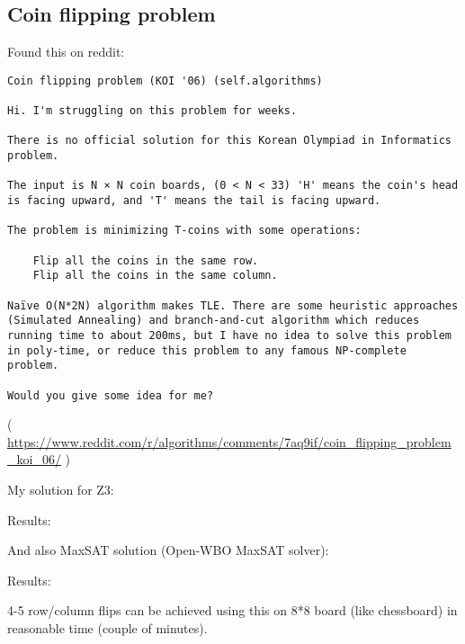 \subsection{Coin flipping problem}
\label{coin_flip}

Found this on reddit:

\begin{lstlisting}
Coin flipping problem (KOI '06) (self.algorithms)

Hi. I'm struggling on this problem for weeks.

There is no official solution for this Korean Olympiad in Informatics problem.

The input is N × N coin boards, (0 < N < 33) 'H' means the coin's head is facing upward, and 'T' means the tail is facing upward.

The problem is minimizing T-coins with some operations:

    Flip all the coins in the same row.
    Flip all the coins in the same column.

Naïve O(N*2N) algorithm makes TLE. There are some heuristic approaches (Simulated Annealing) and branch-and-cut algorithm which reduces running time to about 200ms, but I have no idea to solve this problem in poly-time, or reduce this problem to any famous NP-complete problem.

Would you give some idea for me?
\end{lstlisting}

( \url{https://www.reddit.com/r/algorithms/comments/7aq9if/coin_flipping_problem_koi_06/} )

My solution for Z3:



Results:



And also MaxSAT solution (Open-WBO MaxSAT solver): 



Results:



4-5 row/column flips can be achieved using this on 8*8 board (like chessboard) in reasonable time (couple of minutes).

